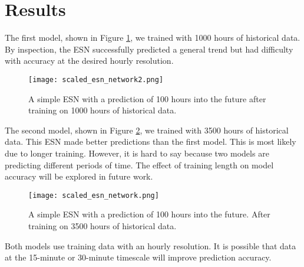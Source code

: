 \section{Results}

The first model, shown in Figure \ref{fig:ESN1}, we trained with 1000 hours of
historical data. By inspection, the \gls{ESN} successfully predicted a general
trend but had difficulty with accuracy at the desired hourly resolution.

\begin{figure}[h]
  \centering
  \texttt{[image: scaled\_esn\_network2.png]}
  \caption{A simple ESN with a prediction of 100 hours into the future after
  training on 1000 hours of historical data.}
  \label{fig:ESN1}
\end{figure}

The second model, shown in Figure \ref{fig:ESN2}, we trained with 3500 hours of
historical data. This \gls{ESN} made better predictions than the first model.
This is most likely due to longer training. However, it is hard to say because
two models are predicting different periods of time. The effect of training
length on model accuracy will be explored in future work.

\begin{figure}[h]
  \centering
  \texttt{[image: scaled\_esn\_network.png]}
  \caption{A simple ESN with a prediction of 100 hours into the future. After
  training on 3500 hours of historical data.}
  \label{fig:ESN2}
\end{figure}

Both models use training data with an hourly resolution. It is possible
that data at the 15-minute or 30-minute timescale will improve prediction
accuracy.
